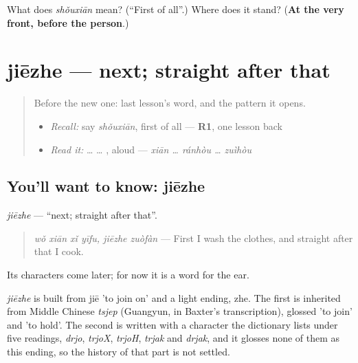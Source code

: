 \begin{tcolorbox}[breakable,colback=teal!4,colframe=teal!35!black,title={Before you move on}]
What does \emph{shǒuxiān} mean? (\textquotedblleft{}First of all\textquotedblright{}.) Where does it stand? (\textbf{At the very front, before the person}.)
\end{tcolorbox}
\section[jiēzhe]{jiēzhe — next; straight after that}

\label{lesson:ZH-C278-jiezhe}



\begin{quote}
Before the new one: last lesson's word, and the pattern it opens.

\begin{itemize}
\raggedright
  \item \emph{Recall:} say \emph{shǒuxiān}, first of all — \textbf{R1}, one lesson back
  \item \emph{Read it:}  …  … , aloud — \emph{xiān … ránhòu … zuìhòu}
\end{itemize}
\end{quote}

\subsection*{You'll want to know: jiēzhe}
\emph{jiēzhe} — \textquotedblleft{}next; straight after that\textquotedblright{}.

\begin{quote}
\emph{wǒ xiān xǐ yīfu, jiēzhe zuòfàn} — First I wash the clothes, and straight after that I cook.
\end{quote}

Its characters come later; for now it is a word for the ear.

\begin{cousinweb}
\emph{jiēzhe} is built from jiē 'to join on' and a light ending, zhe. The first is inherited from Middle Chinese \emph{tsjep} (Guangyun, in Baxter's transcription), glossed 'to join' and 'to hold'. The second is written with a character the dictionary lists under five readings, \emph{drjo}, \emph{trjoX}, \emph{trjoH}, \emph{trjak} and \emph{drjak}, and it glosses none of them as this ending, so the history of that part is not settled.
\end{cousinweb}

